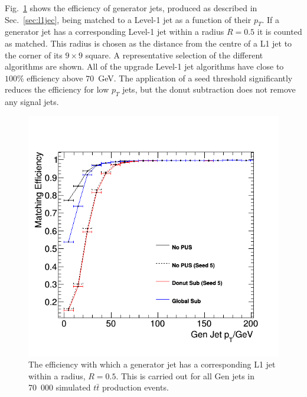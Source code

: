 Fig.~\ref{fig:matchingeff} shows the efficiency of generator jets,
produced as described in Sec.~\ref{sec:l1jec}, being matched to a
Level-1 jet as a function of their $p_T$. If a generator jet has a
corresponding Level-1 jet within a radius $R=0.5$ it is counted as
matched.
This radius is chosen as the distance from the centre of a L1 jet to
the corner of its $9\times9$ square. A representative selection of the
different \PUS algorithms are shown. All of the upgrade Level-1 jet
algorithms have close to $100\%$ efficiency above $70$~GeV. The
application of a seed threshold significantly reduces the efficiency
for low $p_T$ jets, but the donut subtraction does not remove any
signal jets.
\begin{figure}
	\begin{center}
		\includegraphics[width=0.7\linewidth]{figs/trigger/performance/matchingeff_alljet}
	\end{center}
	\caption{The efficiency with which a generator jet has a
  corresponding L1 jet within a radius, $R=0.5$. This is carried out
  for all Gen jets in 70~000 simulated $t\bar{t}$ production events.}
	\label{fig:matchingeff}
\end{figure}

